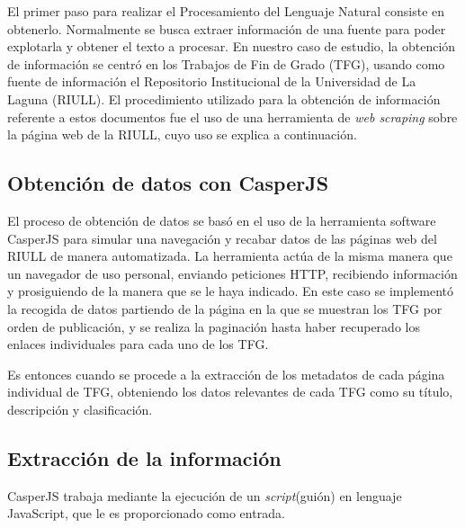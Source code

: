 \lhead{\emph{\ChapterTwo{}}}

El primer paso para realizar el Procesamiento del Lenguaje Natural consiste en obtenerlo. Normalmente se busca extraer información de una fuente para poder explotarla y obtener el texto a procesar.
%
En nuestro caso de estudio, la obtención de información se centró en los Trabajos de Fin de Grado (TFG), usando como fuente de información el Repositorio Institucional de la Universidad de La Laguna (RIULL).
%
El procedimiento utilizado para la obtención de información referente a estos documentos fue el uso de una herramienta de \textit{web scraping} sobre la página web de la RIULL, cuyo uso se explica a continuación.

\subsection{Obtención de datos con CasperJS}



El proceso de obtención de datos se basó en el uso de la herramienta software CasperJS \cite{casperjs} para simular una navegación y recabar datos de las páginas web del RIULL de manera automatizada.
%
La herramienta actúa de la misma manera que un navegador de uso personal, enviando peticiones HTTP, recibiendo información y prosiguiendo de la manera que se le haya indicado.
En este caso se implementó la recogida de datos partiendo de la página en la que se muestran los TFG por orden de publicación, y se realiza la paginación hasta haber recuperado los enlaces individuales para cada uno de los TFG.

Es entonces cuando se procede a la extracción de los metadatos de cada página individual de TFG, obteniendo los datos relevantes de cada TFG como su título, descripción y clasificación.

\subsection{Extracción de la información}

CasperJS trabaja mediante la ejecución de un \textit{script}(guión) en lenguaje JavaScript, que le es proporcionado como entrada.

